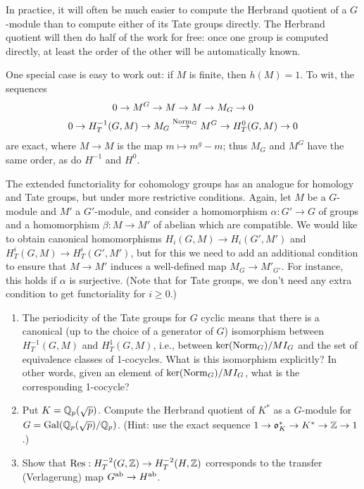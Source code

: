 In practice, it will often be much easier to compute the Herbrand quotient
of a $G$-module than to compute either of its Tate groups directly. The
Herbrand quotient will then do half of the work for free: once one group
is computed directly, at least the order of the other will be automatically
known.

One special case is easy to work out: if $M$ is finite, then $h(M) = 1$.
To wit, the sequences
\begin{gather*}
0 \to M^G \to M \to M \to M_G \to 0 \\
0 \to H^{-1}_T(G,M) \to M_G \stackrel{\operatorname{Norm}_G}{\to} M^G \to H^0_T(G,M) \to 0
\end{gather*}
are exact, where $M \to M$ is the map $m \mapsto m^g - m$; thus
$M_G$ and $M^G$ have the same order, as do $H^{-1}$ and $H^0$.


The extended functoriality for cohomology groups has an analogue for homology and Tate groups, but under more restrictive conditions. Again, let $M$ be a $G$-module and $M'$ a $G'$-module, and consider a homomorphism $\alpha: G' \to G$ of groups and a homomorphism
$\beta: M \to M'$ of abelian which are compatible.
We would like to obtain canonical homomorphisms 
$H_i(G, M) \to H_i(G', M')$ and $H^i_T(G, M) \to H^i_T(G',M')$,
but for this we need to add an additional condition to ensure that $M \to M'$
induces a well-defined map $M_G \to M'_{G'}$. For instance, this holds if $\alpha$ is surjective. (Note that for Tate groups, we don't need any extra condition to get functoriality for $i \geq 0$.)


\begin{enumerate}
\item
The periodicity of the Tate groups for $G$ cyclic means that there is
a canonical (up to the choice of a generator of $G$) isomorphism between $H^{-1}_T(G, M)$ and $H^1_T(G,M)$,
i.e., between $\ker(\operatorname{Norm}_G)/MI_G$ and the set of equivalence classes
of 1-cocycles. What is this isomorphism explicitly? In other words, given an
element of $\ker(\operatorname{Norm}_G)/MI_G$, what is the corresponding 1-cocycle?
\item
Put $K = \mathbb{Q}_p(\sqrt{p})$. Compute the Herbrand quotient of
$K^*$ as a $G$-module for $G = \operatorname{Gal}(\mathbb{Q}_p(\sqrt{p})/\mathbb{Q}_p)$. (Hint:
use the exact sequence $1 \to \mathfrak{o}_K^* \to K^* \to \mathbb{Z} \to 1$.)
\item
Show that $\operatorname{Res}: H^{-2}_T(G, \mathbb{Z}) \to H^{-2}_T(H,\mathbb{Z})$ corresponds to
the transfer (Verlagerung) map $G^{\operatorname{ab}} \to H^{\operatorname{ab}}$.
\end{enumerate}

%


